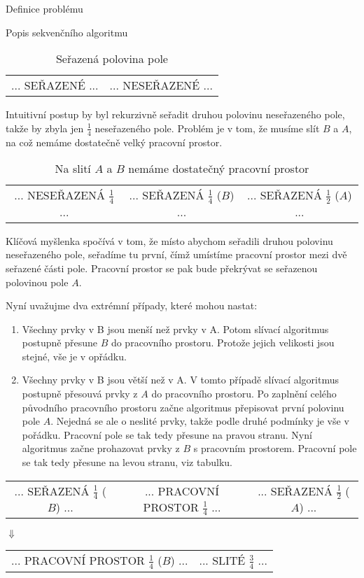 \documentclass[a4paper,11pt]{article}
\begin{document}
\begin{section}{Definice problému}
\begin{subsection}{Popis sekvenčního algoritmu}
\begin{table}[ht]
\centering
\begin{tabular}{|c|c|}
... SEŘAZENÉ ... & ... NESEŘAZENÉ ...
\end{tabular}
\caption{Seřazená polovina pole}
\end{table}

Intuitivní postup by byl rekurzivně seřadit druhou polovinu neseřazeného pole, takže by zbyla jen $\frac{1}{4}$
neseřazeného pole. Problém je v tom, že musíme slít $B$ a $A$, na což nemáme dostatečně velký pracovní prostor.


\begin{table}[ht]
\centering
\begin{tabular}{|c|c|c|}
... NESEŘAZENÁ $\frac{1}{4}$ ... & ... SEŘAZENÁ $\frac{1}{4}$ ($B$) ... & ... SEŘAZENÁ $\frac{1}{2}$ ($A$) ...
\end{tabular}
\caption{Na slití $A$ a $B$ nemáme dostatečný pracovní prostor}
\end{table}

Klíčová myšlenka spočívá v tom, že místo abychom seřadili druhou polovinu neseřazeného pole, seřadíme tu první,
čímž umístíme pracovní prostor mezi dvě seřazené části pole. Pracovní prostor se pak bude překrývat se seřazenou 
polovinou pole $A$.

Nyní uvažujme dva extrémní případy, které mohou nastat:
\begin{enumerate}
	\item Všechny prvky v B jsou menší než prvky v A. Potom slívací algoritmus postupně přesune $B$ do pracovního
prostoru. Protože jejich velikosti jsou stejné, vše je v opřádku.

	\item Všechny prvky v B jsou větší než v A. V tomto případě slívací algoritmus postupně přesouvá prvky z $A$
do pracovního prostoru. Po zaplnění celého původního pracovního prostoru začne algoritmus přepisovat první polovinu
pole $A$. Nejedná se ale o neslité prvky, takže podle druhé podmínky je vše v pořádku. Pracovní pole se tak tedy 
přesune na pravou stranu. Nyní algoritmus začne prohazovat prvky z $B$ s pracovním prostorem. Pracovní pole se tak 
tedy přesune na levou stranu, viz tabulku.
\end{enumerate}

\begin{table}[ht]
\centering
\begin{tabular}{|c|c|c|}
... SEŘAZENÁ $\frac{1}{4}$ ($B$) ... & ... PRACOVNÍ PROSTOR $\frac{1}{4}$ ... & ... SEŘAZENÁ $\frac{1}{2}$ ($A$) ...
\end{tabular}
\begin{center}
$\Downarrow$
\end{center}
\begin{tabular}{|c|c|}
... PRACOVNÍ PROSTOR $\frac{1}{4}$ ($B$) ... & ... SLITÉ $\frac{3}{4}$ ...
\end{tabular}


\end{table}
\end{subsection}
\end{section}
\end{document}
